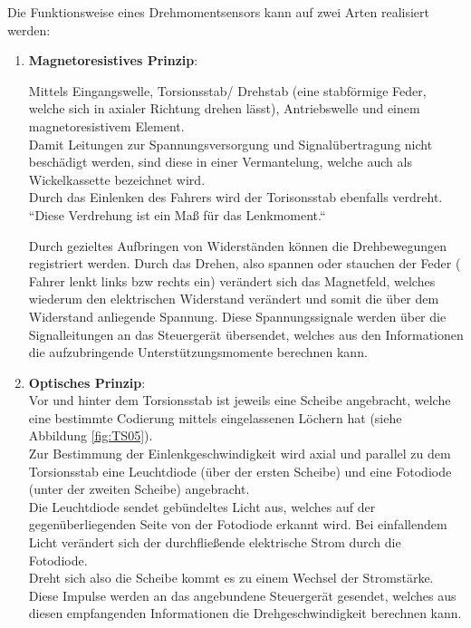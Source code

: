 \begin{flushleft}
	            Die Funktionsweise eines Drehmomentsensors kann auf zwei Arten realisiert werden:\\
	            
	            \begin{enumerate}
	                \item \textbf{Magnetoresistives Prinzip}:
	                
	                         Mittels Eingangswelle, Torsionsstab/ Drehstab (eine stabförmige Feder, welche sich in axialer Richtung drehen lässt), Antriebswelle und einem magnetoresistivem Element. \\
	                         Damit Leitungen zur Spannungsversorgung und Signalübertragung nicht beschädigt werden, sind diese in einer Vermantelung, welche auch als Wickelkassette bezeichnet wird.\\
	                         
	                         Durch das Einlenken des Fahrers wird der Torisonsstab ebenfalls verdreht. ``Diese Verdrehung ist ein Maß für das Lenkmoment.`` \cite{TS_dreh}
	
	                         Durch gezieltes Aufbringen von Widerständen können die Drehbewegungen registriert werden. Durch das Drehen, also spannen oder stauchen der Feder ( Fahrer lenkt links bzw rechts ein) verändert sich das Magnetfeld, welches wiederum den elektrischen Widerstand verändert und somit die über dem Widerstand anliegende Spannung. Diese Spannungssignale werden über die Signalleitungen an das Steuergerät übersendet, welches aus den Informationen die aufzubringende Unterstützungsmomente berechnen kann.				 
	
	                \item \textbf{Optisches Prinzip}:\\
	
	                        Vor und hinter dem Torsionsstab ist jeweils eine Scheibe angebracht, welche eine bestimmte Codierung mittels eingelassenen Löchern hat (siehe Abbildung \ref{fig:TS05}).\\
	                        Zur Bestimmung der Einlenkgeschwindigkeit wird axial und parallel zu dem Torsionsstab eine Leuchtdiode (über der ersten Scheibe) und eine Fotodiode (unter der zweiten Scheibe) angebracht. \\
	                        Die Leuchtdiode sendet gebündeltes Licht aus, welches auf der gegenüberliegenden Seite von der Fotodiode erkannt wird. Bei einfallendem Licht verändert sich der durchfließende elektrische Strom durch die Fotodiode.\\
	                        Dreht sich also die Scheibe kommt es zu einem Wechsel der Stromstärke. Diese Impulse werden an das angebundene Steuergerät gesendet, welches aus diesen empfangenden Informationen die Drehgeschwindigkeit berechnen kann.\\
	                        

\end{enumerate}
\end{flushleft}
